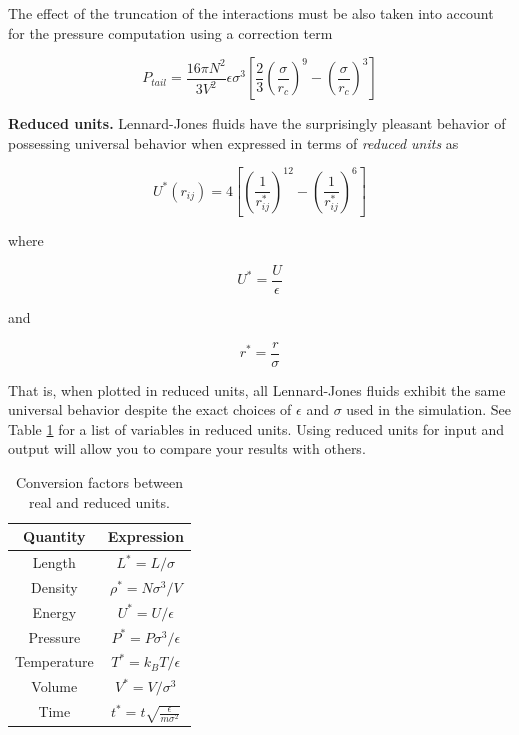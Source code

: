 \documentclass[aip,jcp,preprint,superscriptaddress,floatfix]{revtex4-1}
\begin{document}
The effect of the truncation of the interactions must be also taken into account for the pressure
computation using a correction term

\begin{equation}
        P_{tail} = \frac{16 \pi N^2}{3 V^2} \epsilon \sigma^3
        \left[\frac{2}{3} \left(\frac{\sigma}{r_c} \right)^9 
        - \left(\frac{\sigma}{r_c} \right)^3 \right]
\end{equation}




\textbf{Reduced units.}
Lennard-Jones fluids have the surprisingly pleasant behavior of possessing universal behavior when expressed in terms of \emph{reduced units} as

\begin{equation}
	U^*\left(r_{ij} \right) = 4 \left[\left(\frac{1}{r^*_{ij}}\right)^{12} -\left(\frac{1}{r^*_{ij}}\right)^{6} \right]
	\label{eq.lennardjonesReduced}
\end{equation}

where 

\begin{equation}
	U^* = \frac{U}{\epsilon}
\end{equation}

and 

\begin{equation}
	r^* = \frac{r}{\sigma}
\end{equation}

That is, when plotted in reduced units, all Lennard-Jones fluids exhibit the same universal behavior despite the exact choices of $\epsilon$ and $\sigma$ used in the simulation. See Table \ref{table:reducedUnits} for a list
of variables in reduced units.
Using reduced units for input and output will allow you to compare your results with others.

\begin{table}[t]
\centering
 \begin{tabular}{|c c|} 
 \hline
 Quantity & Expression \\ [0.5ex] 
 \hline\hline
 Length &  $L^*=L / \sigma$   \\ 
 Density &  $\rho^* = N \sigma^3 / V$   \\
 Energy &  $U^* = U / \epsilon$   \\
 Pressure &  $P^* = P \sigma^3 / \epsilon$   \\
 Temperature & $T^* = k_B T / \epsilon$ \\
 Volume & $V^* = V / \sigma^3$ \\
 Time & $t^* = t \sqrt{\frac{\epsilon}{m \sigma^2}}$ \\
 \hline
 \end{tabular}
 \caption{Conversion factors between real and reduced units.}
 \label{table:reducedUnits}
\end{table}
\end{document}
